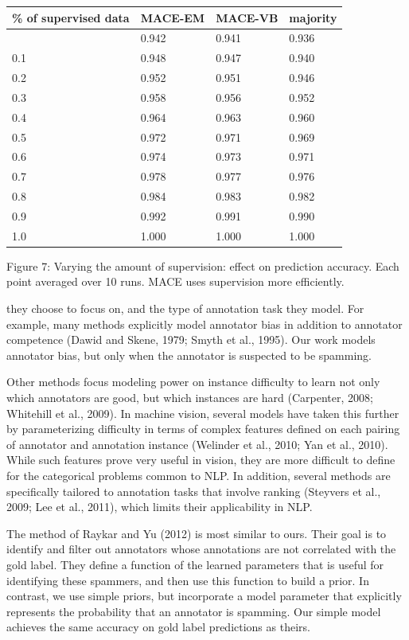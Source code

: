 \documentclass[
]{article}
\newcounter{none} %
\begin{document}
{\def\LTcaptype{none} %
\begin{longtable}[]{@{}llll@{}}
\toprule\noalign{}
\% of supervised data & MACE-EM & MACE-VB & majority \\
\midrule\noalign{}
\endhead
\bottomrule\noalign{}
\endlastfoot
0.0 & 0.942 & 0.941 & 0.936 \\
0.1 & 0.948 & 0.947 & 0.940 \\
0.2 & 0.952 & 0.951 & 0.946 \\
0.3 & 0.958 & 0.956 & 0.952 \\
0.4 & 0.964 & 0.963 & 0.960 \\
0.5 & 0.972 & 0.971 & 0.969 \\
0.6 & 0.974 & 0.973 & 0.971 \\
0.7 & 0.978 & 0.977 & 0.976 \\
0.8 & 0.984 & 0.983 & 0.982 \\
0.9 & 0.992 & 0.991 & 0.990 \\
1.0 & 1.000 & 1.000 & 1.000 \\
\end{longtable}
}

Figure 7: Varying the amount of supervision: effect on prediction
accuracy. Each point averaged over 10 runs. MACE uses supervision more
efficiently.

they choose to focus on, and the type of annotation task they model. For
example, many methods explicitly model annotator bias in addition to
annotator competence (Dawid and Skene, 1979; Smyth et al., 1995). Our
work models annotator bias, but only when the annotator is suspected to
be spamming.

Other methods focus modeling power on instance difficulty to learn not
only which annotators are good, but which instances are hard (Carpenter,
2008; Whitehill et al., 2009). In machine vision, several models have
taken this further by parameterizing difficulty in terms of complex
features defined on each pairing of annotator and annotation instance
(Welinder et al., 2010; Yan et al., 2010). While such features prove
very useful in vision, they are more difficult to define for the
categorical problems common to NLP. In addition, several methods are
specifically tailored to annotation tasks that involve ranking (Steyvers
et al., 2009; Lee et al., 2011), which limits their applicability in
NLP.

The method of Raykar and Yu (2012) is most similar to ours. Their goal
is to identify and filter out annotators whose annotations are not
correlated with the gold label. They define a function of the learned
parameters that is useful for identifying these spammers, and then use
this function to build a prior. In contrast, we use simple priors, but
incorporate a model parameter that explicitly represents the probability
that an annotator is spamming. Our simple model achieves the same
accuracy on gold label predictions as theirs.
\end{document}
